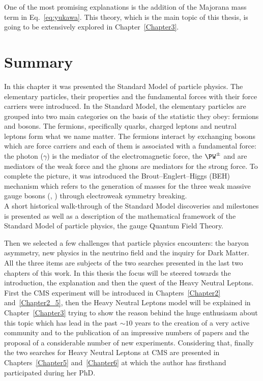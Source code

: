 One of the most promising explanations is the addition of the Majorana mass term in Eq.~\ref{eq:yukawa}. This theory, which is the main topic of this thesis, is going to be extensively explored in Chapter~\ref{Chapter3}.

\section{Summary}\label{sec:summaryC1}
In this chapter it was presented the Standard Model of particle physics.
The elementary particles, 
their properties and the fundamental forces with their force carriers were introduced. 
In the Standard Model, the elementary particles are grouped into two main categories on the basis of the statistic they obey: fermions and bosons. The fermions, specifically quarks, charged leptons and neutral leptons form what we name matter. The fermions interact by exchanging bosons which are force carriers and each of them is associated with a fundamental force: the photon ($\gamma$) is the mediator of the electromagnetic force, the $\PW^{\pm}$ and \PZ are mediators of the weak force and the gluons are mediators for the strong force.
To complete the picture, it was introduced the Brout–Englert–Higgs (BEH) mechanism which refers to the generation of masses for the three weak massive gauge bosons (\PW, \PZ) through electroweak symmetry breaking.\\
A short historical walk-through of the Standard Model discoveries and milestones is presented as well as a description of the mathematical framework of the Standard Model of particle physics, the gauge Quantum Field Theory.

Then we selected a few challenges that particle
physics encounters: the baryon asymmetry, new physics in the neutrino field and
the inquiry for Dark Matter. All the three items are subjects of the two searches presented in the last two chapters of this work. In this thesis the focus will be steered towards the introduction, the explanation and then the quest of the Heavy Neutral Leptons. \\
First the CMS experiment will be introduced in Chapters~\ref{Chapter2} and~\ref{Chapter2_5}, then the Heavy Neutral Leptons model will be explained in Chapter~\ref{Chapter3} trying to show the reason behind the huge enthusiasm about this topic which has lead in the past $\sim10$ years to the creation of a very active community and to the publication of an impressive numbers of papers and the proposal of a considerable number of new experiments. Considering that, finally the two searches for Heavy Neutral Leptons at CMS are presented in Chapters~\ref{Chapter5} and~\ref{Chapter6} at which the author has firsthand participated during her PhD.


